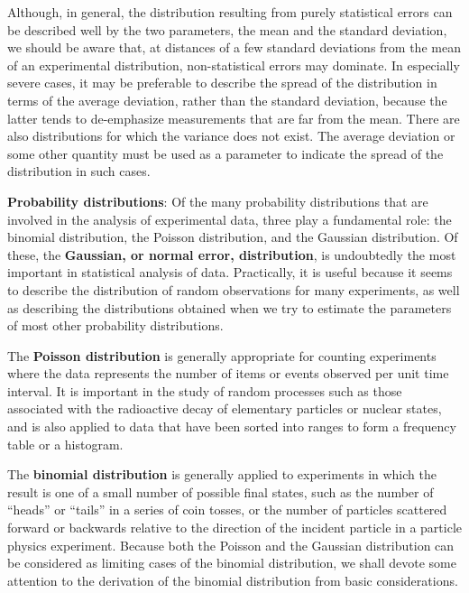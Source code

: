 \documentclass[a4paper,10pt]{article}
\begin{document}
{\noindent}Although, in general, the distribution resulting from purely statistical errors can be described well by the two parameters, the mean and the standard deviation, we should be aware that, at distances of a few standard deviations from the mean of an experimental distribution, non-statistical errors may dominate. In especially severe cases, it may be preferable to describe the spread of the distribution in terms of the average deviation, rather than the standard deviation, because the latter tends to de-emphasize measurements that are far from the mean. There are also distributions for which the variance does not exist. The average deviation or some other quantity must be used as a parameter to indicate the spread of the distribution in such cases. 

{\noindent}\textbf{Probability distributions}: Of the many probability distributions that are involved in the analysis of experimental data, three play a fundamental role: the binomial distribution, the Poisson distribution, and the Gaussian distribution. Of these, the \textbf{Gaussian, or normal error, distribution}, is undoubtedly the most important in statistical analysis of data. Practically, it is useful because it seems to describe the distribution of random observations for many experiments, as well as describing the distributions obtained when we try to estimate the parameters of most other probability distributions. 

{\noindent}The \textbf{Poisson distribution} is generally appropriate for counting experiments where the data represents the number of items or events observed per unit time interval. It is important in the study of random processes such as those associated with the radioactive decay of elementary particles or nuclear states, and is also applied to data that have been sorted into ranges to form a frequency table or a histogram. 

{\noindent}The \textbf{binomial distribution} is generally applied to experiments in which the result is one of a small number of possible final states, such as the number of ``heads'' or ``tails'' in a series of coin tosses, or the number of particles scattered forward or backwards relative to the direction of the incident particle in a particle physics experiment. Because both the Poisson and the Gaussian distribution can be considered as limiting cases of the binomial distribution, we shall devote some attention to the derivation of the binomial distribution from basic considerations.
\end{document}
